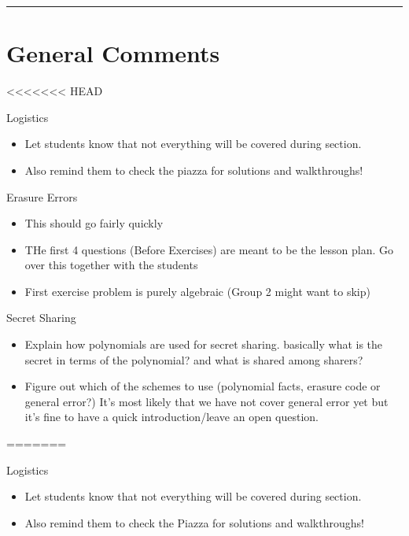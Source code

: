 \documentclass{exam}
\title{}
\date{Polynomials, Secret Sharing, Erasure Errors, General Errors, Self Reference}
\begin{document}
\maketitle
\rule{\textwidth}{0.15em}
\fontsize{12}{15}\selectfont
\thispagestyle{empty}

\section{General Comments}
\begin{questions}
<<<<<<< HEAD
\item Logistics
\begin{itemize}
\item Let students know that not everything will be covered during section. 
\item Also remind them to check the piazza for solutions and walkthroughs!
\end{itemize}
\item Erasure Errors
\begin{itemize}
\item This should go fairly quickly
\item THe first 4 questions (Before Exercises) are meant to be the lesson plan. Go over this together with the students
\item First exercise problem is purely algebraic (Group 2 might want to skip)
\end{itemize}

\item Secret Sharing
\begin{itemize}
\item Explain how polynomials are used for secret sharing. basically what is the secret in terms of the polynomial? and what is shared among sharers?
\item Figure out which of the schemes to use (polynomial facts, erasure code or general error?) It's most likely that we have not cover general error yet but it's fine to have a quick introduction/leave an open question.
\end{itemize}

=======
	\item Logistics
	\begin{itemize}
		\item Let students know that not everything will be covered during section. 
		\item Also remind them to check the Piazza for solutions and walkthroughs!
	\end{itemize}


\end{questions}
\end{document}
